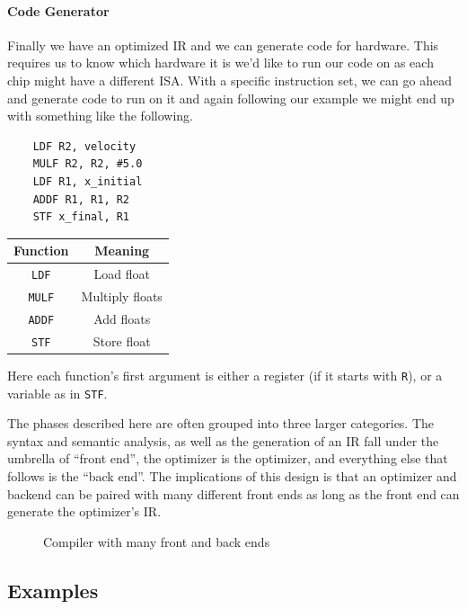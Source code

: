 \paragraph{Code Generator}
Finally we have an optimized \ac{IR} and we can generate code for hardware.
This requires us to know which hardware it is we'd like to run our code on as each chip might have a different \ac{ISA}.
With a specific instruction set, we can go ahead and generate code to run on it and again following our example we might end up with something like the following.

\begin{minipage}{0.5\textwidth}
    \begin{lstlisting}
    LDF R2, velocity
    MULF R2, R2, #5.0
    LDF R1, x_initial
    ADDF R1, R1, R2
    STF x_final, R1
\end{lstlisting}
\end{minipage}
\begin{minipage}{0.5\textwidth}
    \centering
    \begin{tabular}{cc}
        Function      & Meaning         \\ \toprule
        \texttt{LDF}  & Load float      \\
        \texttt{MULF} & Multiply floats \\
        \texttt{ADDF} & Add floats      \\
        \texttt{STF}  & Store float
    \end{tabular}
    \label{fig:machcode}
\end{minipage}
Here each function's first argument is either a register (if it starts with \texttt{R}), or a variable as in \texttt{STF}.

The phases described here are often grouped into three larger categories.
The syntax and semantic analysis, as well as the generation of an \ac{IR} fall under the umbrella of ``front end'', the optimizer is the optimizer, and everything else that follows is the ``back end''.
The implications of this design is that an optimizer and backend can be paired with many different front ends as long as the front end can generate the optimizer's \ac{IR}.
\begin{figure}[ht]
    \centering
    
    \caption{Compiler with many front and back ends}\label{fig:compends}
\end{figure}

\subsection{Examples}

